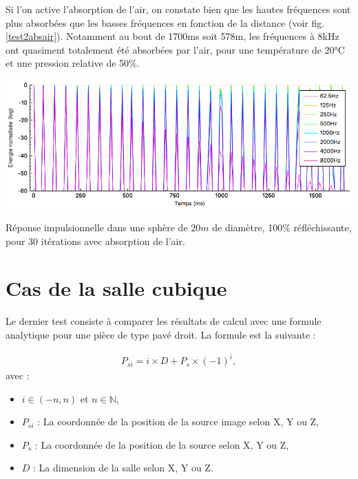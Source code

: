 Si l'on active l'absorption de l'air, on constate bien que les hautes fréquences sont plus absorbées que les basses fréquences en fonction de la distance (voir fig. \ref{test2absair}). Notamment au bout de 1700ms soit 578m, les fréquences à 8kHz ont quasiment totalement été absorbées par l'air, pour une température de 20°C et une pression relative de 50\%.


\begin{figureth}
	\includegraphics[width=\linewidth]{images/test2absair}
	\caption{Réponse impulsionnelle dans une sphère de $20m$ de diamètre, 100\% réfléchissante, pour 30 itérations avec absorption de l'air.}
	\label{test2absair}
\end{figureth}



\section{Cas de la salle cubique}

Le dernier test consiste à comparer les résultats de calcul avec une formule analytique pour une pièce de type pavé droit. La formule \cite[p. 182-189]{mcgovern} est la suivante : 

%

\begin{align}
P_{si} = i \times D + P_s \times (-1)^i,
\end{align}
avec : 
\begin{itemize}
\item$i \in (-n, n)$ et $n \in \mathbb{N}$,
\item$P_{si}$ : La coordonnée de la position de la source image selon X, Y ou Z,
\item$P_s$ : La coordonnée de la position de la source selon X, Y ou Z,
\item$D$ : La dimension de la salle selon X, Y ou Z.
\end{itemize}

